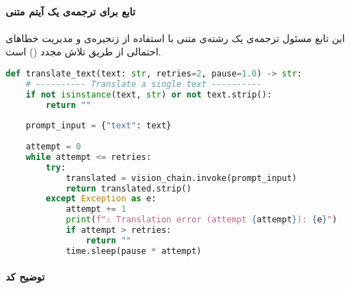 \documentclass{article}
\begin{document}
\paragraph{تابع  برای ترجمه‌ی یک آیتم متنی}

این تابع مسئول ترجمه‌ی یک رشته‌ی متنی با استفاده از زنجیره‌ی  و مدیریت خطاهای احتمالی از طریق تلاش مجدد () است.

\begin{latin}
\begin{lstlisting}[language=Python]
def translate_text(text: str, retries=2, pause=1.0) -> str:
    # ---------- Translate a single text ----------
    if not isinstance(text, str) or not text.strip():
        return ""
    
    prompt_input = {"text": text}
    
    attempt = 0
    while attempt <= retries:
        try:
            translated = vision_chain.invoke(prompt_input)
            return translated.strip()
        except Exception as e:
            attempt += 1
            print(f"⚠️ Translation error (attempt {attempt}): {e}")
            if attempt > retries:
                return ""
            time.sleep(pause * attempt)
\end{lstlisting}
\end{latin}

\paragraph{توضیح کد }
\end{document}
